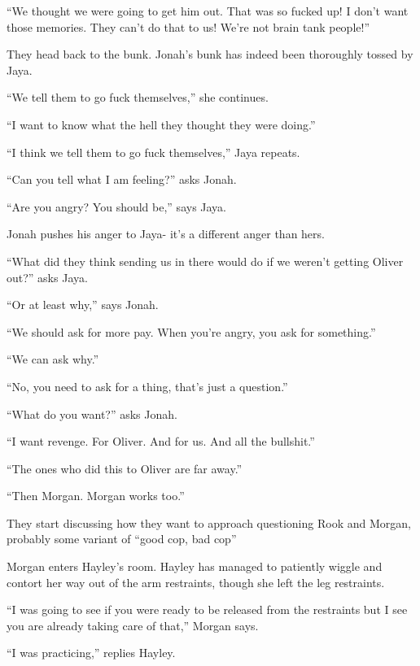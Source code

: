 ``We thought we were going to get him out.  That was so fucked up!  I don't want those memories.  They can't do that to us!  We're not brain tank people!''



They head back to the bunk.  Jonah's bunk has indeed been thoroughly tossed by Jaya.

``We tell them to go fuck themselves,'' she continues.

``I want to know what the hell they thought they were doing.''

``I think we tell them to go fuck themselves,'' Jaya repeats.

``Can you tell what I am feeling?'' asks Jonah.

``Are you angry?  You should be,'' says Jaya.

Jonah pushes his anger to Jaya- it's a different anger than hers.



``What did they think sending us in there would do if we weren't getting Oliver out?'' asks Jaya.

``Or at least why,'' says Jonah.

``We should ask for more pay.  When you're angry, you ask for something.''

``We can ask why.''

``No, you need to ask for a thing, that's just a question.''

``What do you want?'' asks Jonah.

``I want revenge. For Oliver.  And for us.  And all the bullshit.''

``The ones who did this to Oliver are far away.''

``Then Morgan.  Morgan works too.''



They start discussing how they want to approach questioning Rook and Morgan, probably some variant of ``good cop, bad cop''





Morgan enters Hayley's room.  Hayley has managed to patiently wiggle and contort her way out of the arm restraints, though she left the leg restraints.  

``I was going to see if you were ready to be released from the restraints but I see you are already taking care of that,'' Morgan says.

``I was practicing,'' replies Hayley.

